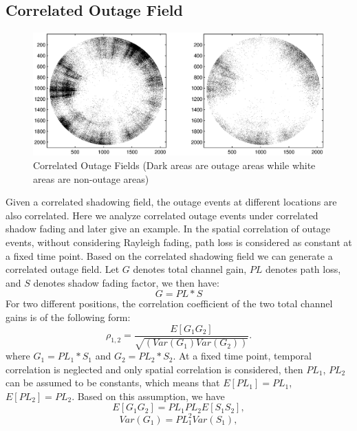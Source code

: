 \subsection{Correlated Outage Field}
\label{outagefield}
\begin{figure}
\centering
\includegraphics[width=12cm]{outagefield.eps}
\caption{Correlated Outage Fields (Dark areas are outage areas while white areas are non-outage areas)}
\label{outagefie}
\end{figure}
Given a correlated shadowing field, the outage events at different locations are also correlated. Here we analyze correlated outage events under correlated shadow fading and later give an example. In the spatial correlation of outage events, without considering Rayleigh fading, path loss is considered as constant at a fixed time point. Based on the correlated shadowing field we can generate a correlated outage field. Let $G$ denotes total channel gain, $PL$ denotes path loss, %
and $S$ denotes shadow fading factor, we then have:
\begin{equation}
G = PL* S
\end{equation}
For two different positions, the correlation coefficient of the two total channel gains is of the following form:
\begin{equation}
\rho_{1,2} = \frac{E[G_{1}G_{2}]}{\sqrt{(Var(G_{1})Var(G_{2}))}}.
\label{eq1}
\end{equation}
where $G_{1}=PL_{1}*S_{1}$ and $G_{2}=PL_{2}*S_{2}$.
At a fixed time point, temporal correlation is neglected and only spatial correlation is considered, then $PL_{1}$, $PL_{2}$ can be assumed to be constants, which means that $E[PL_{1}] = PL_{1}$, $E[PL_{2}] = PL_{2}$. Based on this assumption, we have
\begin{equation}
E[G_{1}G_{2}] = PL_{1}PL_{2}E[S_{1}S_{2}],
\label{eq2}
\end{equation}
\begin{equation}
Var(G_{1}) = PL_{1}^{2}Var(S_{1}),
\label{eq3}
\end{equation}
